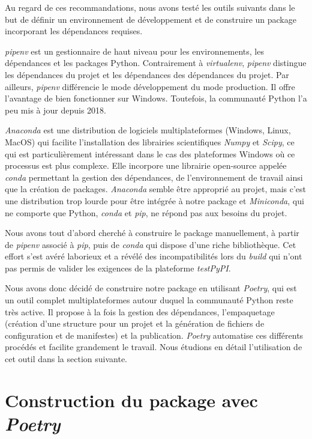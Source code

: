 \documentclass[twoside,a4paper,11pt,frenchb,openany]{report}
\begin{document}
Au regard de ces recommandations, nous avons testé les outils suivants dans le but de définir un environnement de développement et de construire un package incorporant les dépendances requises.

\textit{pipenv} est un gestionnaire de haut niveau pour les environnements, les dépendances et les packages Python. Contrairement à \textit{virtualenv}, \textit{pipenv} distingue les dépendances du projet et les dépendances des dépendances du projet. Par ailleurs, \textit{pipenv} différencie le mode développement du mode production. Il offre l'avantage de bien fonctionner sur Windows. Toutefois, la communauté Python l'a peu mis à jour depuis 2018.

\textit{Anaconda} est une distribution de logiciels multiplateformes (Windows, Linux, MacOS) qui facilite l'installation des librairies scientifiques \textit{Numpy} et \textit{Scipy}, ce qui est particulièrement intéressant dans le cas des plateformes Windows où ce processus est plus complexe. Elle incorpore une librairie open-source appelée \textit{conda} permettant la gestion des dépendances, de l'environnement de travail ainsi que la création de packages. \textit{Anaconda} semble être approprié au projet, mais c'est une distribution trop lourde pour être intégrée à notre package et \textit{Miniconda}, qui ne comporte que Python, \textit{conda} et \textit{pip}, ne répond pas aux besoins du projet.

Nous avons tout d'abord cherché à construire le package manuellement, à partir de \textit{pipenv} associé à \textit{pip}, puis de \textit{conda} qui dispose d'une riche bibliothèque. Cet effort s'est avéré laborieux et a révélé des incompatibilités lors du \textit{build} qui n'ont pas permis de valider les exigences de la plateforme \textit{testPyPI}.

Nous avons donc décidé de construire notre package en utilisant \textit{Poetry}, qui est un outil complet multiplateformes autour duquel la communauté Python reste très active. Il propose à la fois la gestion des dépendances, l'empaquetage (création d'une structure pour un projet et la génération de fichiers de configuration et de manifestes) et la publication. \textit{Poetry} automatise ces différents procédés et facilite grandement le travail. Nous étudions en détail l'utilisation de cet outil dans la section suivante.
	


\chapter{Construction du package avec \textit{Poetry}}
\end{document}
